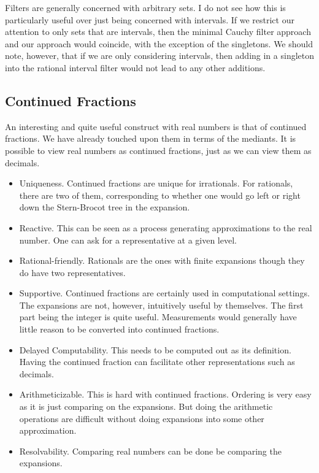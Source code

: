 \documentclass[12pt]{article}
\theoremstyle{remark}
\begin{document}
Filters are generally concerned with arbitrary sets. I do not see how this is particularly useful over just being concerned with intervals. If we restrict our attention to only sets that are intervals, then the minimal Cauchy filter approach and our approach would coincide, with the exception of the singletons. We should note, however, that if we are only considering intervals, then adding in a singleton into the rational interval filter would not lead to any other additions.

\subsection{Continued Fractions}

An interesting and quite useful construct with real numbers is that of continued fractions. We have already touched upon them in terms of the mediants. It is possible to view real numbers as continued fractions, just as we can view them as decimals. 

\begin{itemize}
    \item Uniqueness. Continued fractions are unique for irrationals. For rationals, there are two of them, corresponding to whether one would go left or right down the Stern-Brocot tree in the expansion. 
    \item Reactive. This can be seen as a process generating approximations to the real number. One can ask for a representative at a given level.  
    \item Rational-friendly. Rationals are the ones with finite expansions though they do have two representatives. 
    \item Supportive. Continued fractions are certainly used in computational settings. The expansions are not, however, intuitively useful by themselves. The first part being the integer is quite useful. Measurements would generally have little reason to be converted into continued fractions. 
    \item Delayed Computability. This needs to be computed out as its definition. Having the continued fraction can facilitate other representations such as decimals. 
    \item Arithmeticizable. This is hard with continued fractions. Ordering is very easy as it is just comparing on the expansions. But doing the arithmetic operations are difficult without doing expansions into some other approximation.  
    \item Resolvability. Comparing real numbers can be done be comparing the expansions.
\end{itemize}
\end{document}
